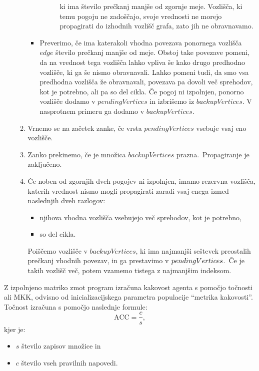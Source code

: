 \documentclass[a4paper,12pt,openright]{book}
\begin{document}
\begin{enumerate}
\begin{enumerate}
\begin{itemize}
\begin{description}
{                    ki ima število prečkanj manjše od zgornje meje. Vozlišča, ki temu pogoju ne zadoščajo, svoje vrednosti
                    ne morejo propagirati do izhodnih vozlišč grafa, zato jih ne obravnavamo.}
                \end{description}
                \item Preverimo, če ima katerakoli vhodna povezava ponornega vozlišča $edge$ število prečkanj manjše od meje.
                Obstoj take povezave pomeni, da na vrednost tega vozlišča lahko vpliva še kako drugo predhodno vozlišče, ki ga
                še nismo obravnavali.
                Lahko pomeni tudi, da smo vsa predhodna vozlišča že obravnavali, povezava pa dovoli več sprehodov, kot je potrebno, ali pa so del cikla.
                Če pogoj ni izpolnjen, ponorno vozlišče dodamo v $pendingVertices$ in izbrišemo iz $backupVertices$.
                V nasprotnem primeru ga dodamo v $backupVertices$.
            \end{itemize}
            \item Vrnemo se na začetek zanke, če vrsta $pendingVertices$ vsebuje vsaj eno vozlišče.
            \item Zanko prekinemo, če je množica $backupVertices$ prazna.\ Propagiranje je zaključeno.
            \item Če noben od zgornjih dveh pogojev ni izpolnjen, imamo rezervna vozlišča,
            katerih vrednost nismo mogli propagirati zaradi vsaj enega izmed naslednjih dveh razlogov:
            \begin{itemize}
                \item njihova vhodna vozlišča vsebujejo več sprehodov, kot je potrebno,
                \item so del cikla.
            \end{itemize}
            Poiščemo vozlišče v $backupVertices$, ki ima najmanjši seštevek preostalih prečkanj vhodnih povezav, in ga prestavimo
            v $pending\-Vertices$.\ Če je takih vozlišč več, potem vzamemo tistega z najmanjšim indeksom.
        \end{enumerate}
    \end{enumerate}

    Z izpolnjeno matriko zmot program izračuna kakovost agenta s pomočjo točnosti ali MKK, odvisno od inicializacijskega parametra populacije \enquote{metrika kakovosti}.
    Točnost izračuna s pomočjo naslednje formule:
    \begin{equation}
        \text{ACC}=\frac{c}{s},
        \label{eq:tocnost}
    \end{equation}
    kjer je:
    \begin{itemize}
        \item $s$ število zapisov množice in
        \item $c$ število vseh pravilnih napovedi.
    \end{itemize}
\end{document}
